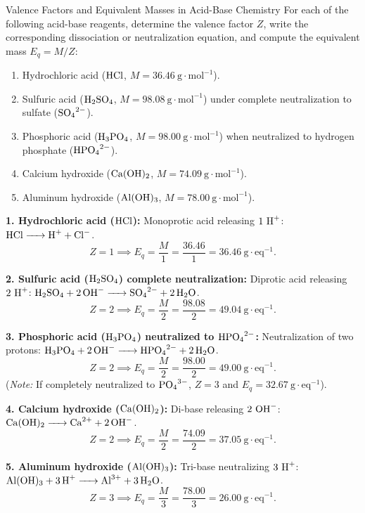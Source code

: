 \begin{exercise}{Valence Factors and Equivalent Masses in Acid-Base Chemistry}
For each of the following acid-base reagents, determine the valence factor $Z$, write the corresponding dissociation or neutralization equation, and compute the equivalent mass $E_q = M/Z$:
\begin{enumerate}[leftmargin=1.5em,itemsep=2pt]
  \item Hydrochloric acid ($\ce{HCl}$, $M = 36.46\ \mathrm{g\cdot mol^{-1}}$).
  \item Sulfuric acid ($\ce{H2SO4}$, $M = 98.08\ \mathrm{g\cdot mol^{-1}}$) under complete neutralization to sulfate ($\ce{SO4^{2-}}$).
  \item Phosphoric acid ($\ce{H3PO4}$, $M = 98.00\ \mathrm{g\cdot mol^{-1}}$) when neutralized to hydrogen phosphate ($\ce{HPO4^{2-}}$).
  \item Calcium hydroxide ($\ce{Ca(OH)2}$, $M = 74.09\ \mathrm{g\cdot mol^{-1}}$).
  \item Aluminum hydroxide ($\ce{Al(OH)3}$, $M = 78.00\ \mathrm{g\cdot mol^{-1}}$).
\end{enumerate}
\end{exercise}

\begin{tabletworkspace}[5.0cm]
\end{tabletworkspace}

\begin{solution}
\textbf{1. Hydrochloric acid ($\ce{HCl}$):}
Monoprotic acid releasing $1\ \ce{H+}$: $\ce{HCl -> H+ + Cl-}$.
\[
Z = 1 \implies E_q = \frac{M}{1} = \frac{36.46}{1} = \mathbf{36.46\ \mathrm{g\cdot eq^{-1}}}.
\]

\textbf{2. Sulfuric acid ($\ce{H2SO4}$) complete neutralization:}
Diprotic acid releasing $2\ \ce{H+}$: $\ce{H2SO4 + 2 OH- -> SO4^{2-} + 2 H2O}$.
\[
Z = 2 \implies E_q = \frac{M}{2} = \frac{98.08}{2} = \mathbf{49.04\ \mathrm{g\cdot eq^{-1}}}.
\]

\textbf{3. Phosphoric acid ($\ce{H3PO4}$) neutralized to $\ce{HPO4^{2-}}$:}
Neutralization of two protons: $\ce{H3PO4 + 2 OH- -> HPO4^{2-} + 2 H2O}$.
\[
Z = 2 \implies E_q = \frac{M}{2} = \frac{98.00}{2} = \mathbf{49.00\ \mathrm{g\cdot eq^{-1}}}.
\]
(\textit{Note:} If completely neutralized to $\ce{PO4^{3-}}$, $Z=3$ and $E_q = 32.67\ \mathrm{g\cdot eq^{-1}}$).

\textbf{4. Calcium hydroxide ($\ce{Ca(OH)2}$):}
Di-base releasing $2\ \ce{OH-}$: $\ce{Ca(OH)2 -> Ca^{2+} + 2 OH-}$.
\[
Z = 2 \implies E_q = \frac{M}{2} = \frac{74.09}{2} = \mathbf{37.05\ \mathrm{g\cdot eq^{-1}}}.
\]

\textbf{5. Aluminum hydroxide ($\ce{Al(OH)3}$):}
Tri-base neutralizing $3\ \ce{H+}$: $\ce{Al(OH)3 + 3 H+ -> Al^{3+} + 3 H2O}$.
\[
Z = 3 \implies E_q = \frac{M}{3} = \frac{78.00}{3} = \mathbf{26.00\ \mathrm{g\cdot eq^{-1}}}.
\]
\end{solution}

